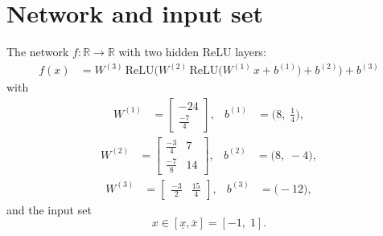 \documentclass[11pt]{article}
\begin{document}
\section{Network and input set}
The network $f:\mathbb{R} \to \mathbb{R}$ with two hidden ReLU layers:
\begin{align*}
f(x) &= W^{(3)}\,\mathrm{ReLU}\bigl(W^{(2)}\,\mathrm{ReLU}\bigl(W^{(1)}\,x + b^{(1)}\bigr) + b^{(2)}\bigr) + b^{(3)}
\end{align*}
with
\begin{align*}
W^{(1)} &= \begin{bmatrix}
-24 \\
\frac{-7}{4}
\end{bmatrix}, & b^{(1)} &= \bigl(8,\; \frac{1}{4}\bigr),
\end{align*}
\begin{align*}
W^{(2)} &= \begin{bmatrix}
\frac{-3}{4} & 7 \\
\frac{-7}{8} & 14
\end{bmatrix}, & b^{(2)} &= \bigl(8,\; -4\bigr),
\end{align*}
\begin{align*}
W^{(3)} &= \begin{bmatrix}
\frac{-3}{2} & \frac{15}{4}
\end{bmatrix}, & b^{(3)} &= \bigl(-12\bigr),
\end{align*}
and the input set
\begin{equation*}
 x \in [\underline{x}, \overline{x}] = [-1,\; 1].
\end{equation*}
\end{document}

